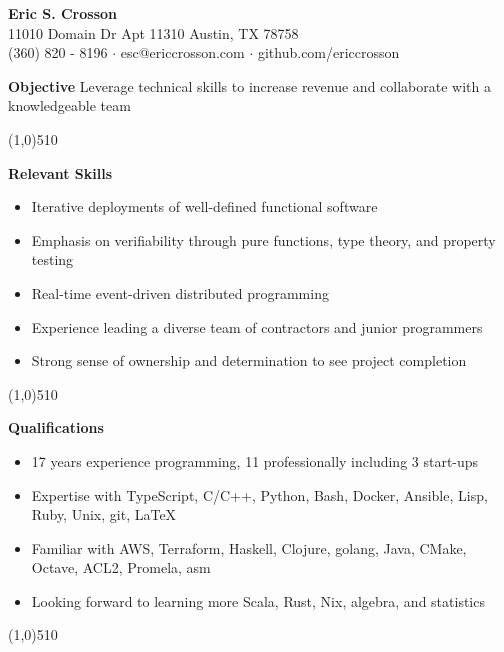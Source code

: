 \documentclass{report}
\newcommand{\cut}{\begin{center} \line(1,0){510} \end{center}}
\begin{document}
\pagestyle{empty}
\setlength\parindent{0pt}

\begin{center}
  \textbf{Eric S. Crosson} \\
  11010 Domain Dr Apt 11310 Austin, TX 78758 \\
  (360) 820 - 8196 $\cdot$ esc@ericcrosson.com $\cdot$ github.com/ericcrosson
\end{center}

\textbf{Objective} \hspace{1mm} Leverage technical skills to increase
revenue and collaborate with a knowledgeable team

\cut{}

\textbf{Relevant Skills}
\begin{itemize}[label=$\cdot$]
\item Iterative deployments of well-defined functional software
\item Emphasis on verifiability through pure functions, type theory, and property testing
\item Real-time event-driven distributed programming
\item Experience leading a diverse team of contractors and junior programmers
\item Strong sense of ownership and determination to see project completion
\end{itemize}

\cut{}

\textbf{Qualifications}
\begin{itemize}[label=$\cdot$]
\item 17 years experience programming, 11 professionally including 3 start-ups
\item Expertise with TypeScript, C/C++, Python, Bash, Docker, Ansible, Lisp, Ruby, Unix, git, \LaTeX{}
\item Familiar with AWS, Terraform, Haskell, Clojure, golang, Java, CMake, Octave, ACL2, Promela, asm
\item Looking forward to learning more Scala, Rust, Nix, algebra, and statistics
\end{itemize}

\cut{}
\end{document}
